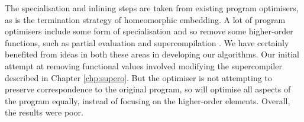The specialisation and inlining steps are taken from existing program optimisers, as is the termination strategy of homeomorphic embedding. A lot of program optimisers include some form of specialisation and so remove some higher-order functions, such as partial evaluation \cite{jones:partial_evaluation} and supercompilation \cite{supercompilation}. We have certainly benefited from ideas in both these areas in developing our algorithms. Our initial attempt at removing functional values involved modifying the supercompiler described in Chapter \ref{chp:supero}. But the optimiser is not attempting to preserve correspondence to the original program, so will optimise all aspects of the program equally, instead of focusing on the higher-order elements. Overall, the results were poor.

